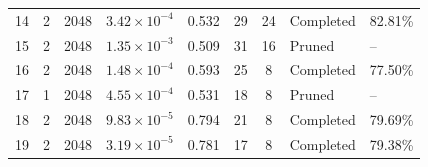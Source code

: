 {\begin{longtable}{lccccccll}
\rowcolor{gray!15} 14 & 2 & 2048 & $3.42\times10^{-4}$ & 0.532 & 29 & 24 & Completed & 82.81\% \\
15 & 2 & 2048 & $1.35\times10^{-3}$ & 0.509 & 31 & 16 & Pruned & -- \\
16 & 2 & 2048 & $1.48\times10^{-4}$ & 0.593 & 25 & 8 & Completed & 77.50\% \\
17 & 1 & 2048 & $4.55\times10^{-4}$ & 0.531 & 18 & 8 & Pruned & -- \\
18 & 2 & 2048 & $9.83\times10^{-5}$ & 0.794 & 21 & 8 & Completed & 79.69\% \\
19 & 2 & 2048 & $3.19\times10^{-5}$ & 0.781 & 17 & 8 & Completed & 79.38\% \\
\end{longtable}
}
